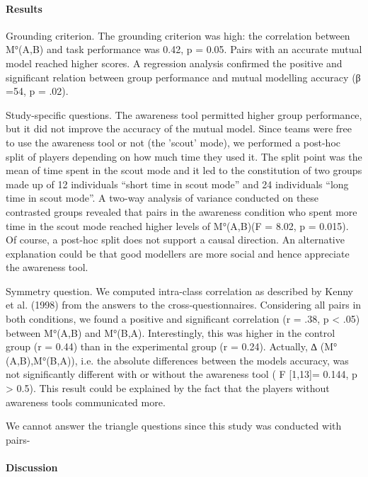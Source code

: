 \documentclass[twocolumn]{article}
\begin{document}
\paragraph{Results}

Grounding criterion. The grounding criterion was high: the correlation between
M°(A,B) and task performance was 0.42, p = 0.05. Pairs with an accurate mutual
model reached higher scores. A regression analysis confirmed the positive and
significant relation between group performance and mutual modelling accuracy (β
=54, p = .02).

Study-specific questions. The awareness tool permitted higher group performance,
but it did not improve the accuracy of the mutual model. Since teams were free
to use the awareness tool or not (the 'scout' mode), we performed a post-hoc
split of players depending on how much time they used it. The split point was
the mean of time spent in the scout mode and it led to the constitution of two
groups made up of 12 individuals “short time in scout mode” and 24 individuals
“long time in scout mode”. A two-way analysis of variance conducted on these
contrasted groups revealed that pairs in the awareness condition who spent more
time in the scout mode reached higher levels of M°(A,B)(F = 8.02, p = 0.015). Of
course, a post-hoc split does not support a causal direction. An alternative
explanation could be that good modellers are more social and hence appreciate
the awareness tool.

Symmetry question. We computed intra-class correlation as described by Kenny et
al. (1998) from the answers to the cross-questionnaires. Considering all pairs
in both conditions, we found a positive and significant correlation (r = .38, p
< .05) between M°(A,B) and M°(B,A). Interestingly, this was higher in the
control group (r = 0.44) than in the experimental group (r = 0.24). Actually, ∆
(M°(A,B),M°(B,A)), i.e. the absolute differences between the models accuracy,
was not significantly different with or without the awareness tool ( F [1,13]=
0.144, p > 0.5). This result could be explained by the fact that the players
without awareness tools communicated more.

We cannot answer the triangle questions since this study was conducted with
pairs-

\paragraph{Discussion}
\end{document}
